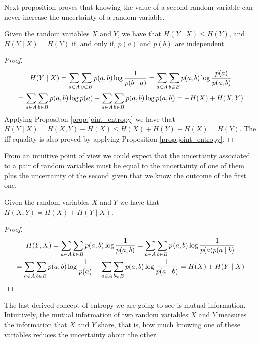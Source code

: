 Next proposition proves that knowing the value of a second random variable can never increase the uncertainty of a random variable.

\begin{proposition}
Given the random variables $X$ and $Y$, we have that $H(Y \mid X) \leq H(Y)$, and $H(Y \mid X) = H(Y)$ if, and only if, $p(a)$ and $p(b)$ are independent.
\end{proposition}
\begin{proof}
\begin{multline}
H(Y \mid X) = \sum_{a \in A} \sum_{y \in B} p(a, b) \log \frac{1}{p(b \mid a)} = \sum_{a \in A} \sum_{b \in B} p(a, b) \log \frac{p(a)}{p(a, b)} \\
\notag = \sum_{a \in A} \sum_{b \in B} p(a, b) \log p(a) - \sum_{a \in A} \sum_{b \in B} p(a, b) \log p(a, b) = -H(X) + H(X, Y)
\end{multline}
Applying Propositon \ref{prop:joint_entropy} we have that $H(Y \mid X) = H(X, Y) - H(X) \leq H(X) + H(Y) - H(X) = H(Y)$.
The iff equality is also proved by applying Proposition \ref{prop:joint_entropy}.
\end{proof}

From an intuitive point of view we could expect that the uncertainty associated to a pair of random variables must be equal to the uncertainty of one of them plus the uncertainty of the second given that we know the outcome of the first one.

\begin{proposition}
\label{prop:chain_rule_entropy}
Given the random variables $X$ and $Y$ we have that $H(X, Y) = H(X) + H(Y \mid X)$.
\end{proposition}
\begin{proof}
\begin{multline}
H(Y, X) = \sum_{a \in A} \sum_{b \in B} p(a, b) \log \frac{1}{p(a, b)} = \sum_{a \in A} \sum_{b \in B} p(a, b) \log \frac{1}{p(a) p(a \mid b)} \\
\notag = \sum_{a \in A} \sum_{b \in B} p(a, b) \log \frac{1}{p(a)} + \sum_{a \in A} \sum_{b \in B} p(a, b) \log \frac{1}{p(a \mid b)} = H(X) + H(Y \mid X)
\end{multline}
\end{proof}


The last derived concept of entropy we are going to see is mutual information. Intuitively, the mutual information of two random variables $X$ and $Y$ measures the information that $X$ and $Y$ share, that is, how much knowing one of these variables reduces the uncertainty about the other.

